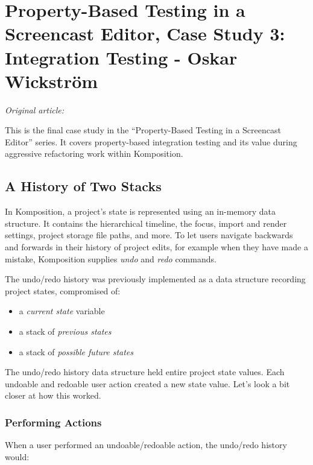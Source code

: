 \chapter{Property-Based Testing in a Screencast Editor, Case Study 3: Integration Testing - Oskar Wickstr\"om}
\label{sec:integration_testing}

\vspace{\baselineskip}
\noindent\textit{Original article: \cite{integration_testing}}
\vspace{\baselineskip}

\noindent This is the final case study in the ``Property-Based Testing in a Screencast Editor'' series. It covers property-based integration testing and its value during aggressive refactoring work within Komposition.

\section{A History of Two Stacks}


In Komposition, a project's state is represented using an in-memory data structure. It contains the hierarchical timeline, the focus, import and render settings, project storage file paths, and more. To let users navigate backwards and forwards in their history of project edits, for example when they have made a mistake, Komposition supplies \textit{undo} and \textit{redo} commands.

The undo/redo history was previously implemented as a data structure recording project states, compromised of:

\begin{itemize}
\item a \textit{current state} variable
\item a stack of \textit{previous states}
\item a stack of \textit{possible future states}
\end{itemize}
The undo/redo history data structure held entire project state values. Each undoable and redoable user action created a new state value. Let's look a bit closer at how this worked.

\subsection{Performing Actions}


When a user performed an undoable/redoable action, the undo/redo history would:

